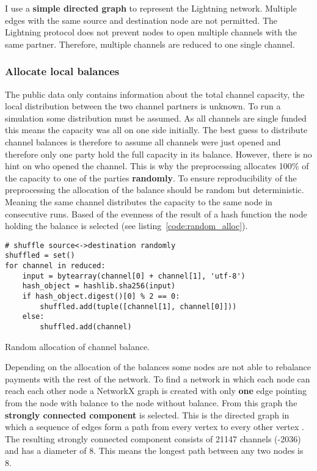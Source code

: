 \documentclass[final]{fhnwreport}       %
\begin{document}
I use a \textbf{simple directed graph} to represent the Lightning network. Multiple edges with the same source and destination node are not permitted. The Lightning protocol does not prevent nodes to open multiple channels with the same partner. Therefore, multiple channels are reduced to one single channel.

\subsubsection{Allocate local balances}
The public data only contains information about the total channel capacity, the local distribution between the two channel partners is unknown. To run a simulation some distribution must be assumed. As all channels are single funded this means the capacity was all on one side initially. The best guess to distribute channel balances is therefore to assume all channels were just opened and therefore only one party hold the full capacity in its balance. However, there is no hint on who opened the channel. This is why the preprocessing allocates 100\% of the capacity to one of the parties \textbf{randomly}. To ensure reproducibility of the preprocessing the allocation of the balance should be random but deterministic. Meaning the same channel distributes the capacity to the same node in consecutive runs. Based of the evenness of the result of a hash function  the node holding the balance is selected (see listing~\ref{code:random_alloc}).

\begin{listing}[H]
  \begin{verbatim}
# shuffle source<->destination randomly
shuffled = set()
for channel in reduced:
    input = bytearray(channel[0] + channel[1], 'utf-8')
    hash_object = hashlib.sha256(input)
    if hash_object.digest()[0] % 2 == 0:
        shuffled.add(tuple([channel[1], channel[0]]))
    else:
        shuffled.add(channel) 
  \end{verbatim}
  \caption{Random allocation of channel balance.}
  \label{code:random_alloc}
\end{listing}

Depending on the allocation of the balances some nodes are not able to rebalance payments with the rest of the network. To find a network in which each node can reach each other node a NetworkX graph is created with only \textbf{one} edge pointing from the node with balance to the node without balance. From this graph the \textbf{strongly connected component} is selected. This is the directed graph in which a sequence of edges form a path from every vertex to every other vertex \citep{even_network_1975}. The resulting strongly connected component consists of 21147 channels (-2036) and has a diameter of 8. This means the longest path between any two nodes is 8.
\end{document}
